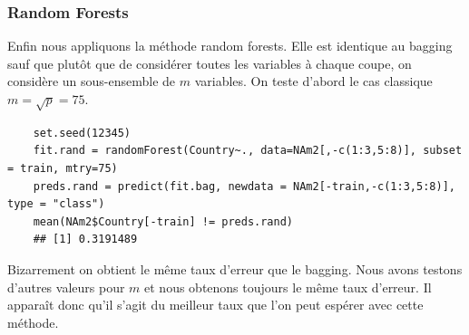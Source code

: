 \documentclass[12pt,a4paper]{article}
\begin{document}
\subsubsection{Random Forests}
Enfin nous appliquons la méthode random forests. Elle est identique au bagging sauf que plutôt que de considérer toutes les variables à chaque coupe, on considère un sous-ensemble de $m$ variables. On teste d'abord le cas classique $m=\sqrt{p} = 75$.
\begin{lstlisting}
	set.seed(12345)
	fit.rand = randomForest(Country~., data=NAm2[,-c(1:3,5:8)], subset = train, mtry=75)
	preds.rand = predict(fit.bag, newdata = NAm2[-train,-c(1:3,5:8)], type = "class")
	mean(NAm2$Country[-train] != preds.rand)
	## [1] 0.3191489
\end{lstlisting}
Bizarrement on obtient le même taux d'erreur que le bagging. Nous avons testons d'autres valeurs pour $m$ et nous obtenons toujours le même taux d'erreur. Il apparaît donc qu'il s'agit du meilleur taux que l'on peut espérer avec cette méthode.
\end{document}
